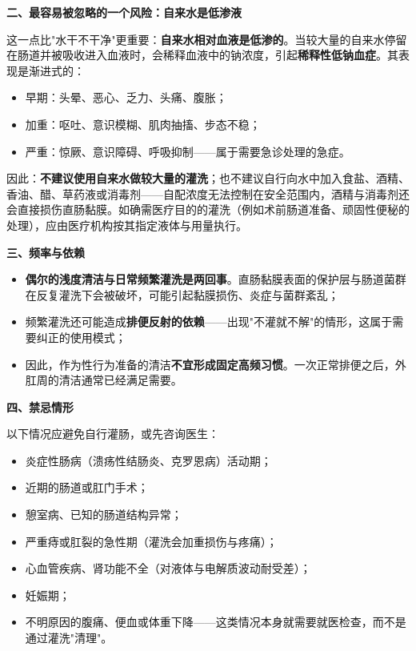 \documentclass[12pt,UTF8]{ctexbook}
\begin{document}
\textbf{二、最容易被忽略的一个风险：自来水是低渗液}

这一点比"水干不干净"更重要：\textbf{自来水相对血液是低渗的}。当较大量的自来水停留在肠道并被吸收进入血液时，会稀释血液中的钠浓度，引起\textbf{稀释性低钠血症}。其表现是渐进式的：

\begin{itemize}
	\item 早期：头晕、恶心、乏力、头痛、腹胀；
	\item 加重：呕吐、意识模糊、肌肉抽搐、步态不稳；
	\item 严重：惊厥、意识障碍、呼吸抑制——属于需要急诊处理的急症。
\end{itemize}

因此：\textbf{不建议使用自来水做较大量的灌洗}；也不建议自行向水中加入食盐、酒精、香油、醋、草药液或消毒剂——自配浓度无法控制在安全范围内，酒精与消毒剂还会直接损伤直肠黏膜。如确需医疗目的的灌洗（例如术前肠道准备、顽固性便秘的处理），应由医疗机构按其指定液体与用量执行。

\textbf{三、频率与依赖}

\begin{itemize}
	\item \textbf{偶尔的浅度清洁与日常频繁灌洗是两回事}。直肠黏膜表面的保护层与肠道菌群在反复灌洗下会被破坏，可能引起黏膜损伤、炎症与菌群紊乱；
	\item 频繁灌洗还可能造成\textbf{排便反射的依赖}——出现"不灌就不解"的情形，这属于需要纠正的使用模式；
	\item 因此，作为性行为准备的清洁\textbf{不宜形成固定高频习惯}。一次正常排便之后，外肛周的清洁通常已经满足需要。
\end{itemize}

\textbf{四、禁忌情形}

以下情况应避免自行灌肠，或先咨询医生：

\begin{itemize}
	\item 炎症性肠病（溃疡性结肠炎、克罗恩病）活动期；
	\item 近期的肠道或肛门手术；
	\item 憩室病、已知的肠道结构异常；
	\item 严重痔或肛裂的急性期（灌洗会加重损伤与疼痛）；
	\item 心血管疾病、肾功能不全（对液体与电解质波动耐受差）；
	\item 妊娠期；
	\item 不明原因的腹痛、便血或体重下降——这类情况本身就需要就医检查，而不是通过灌洗"清理"。
\end{itemize}
\end{document}
